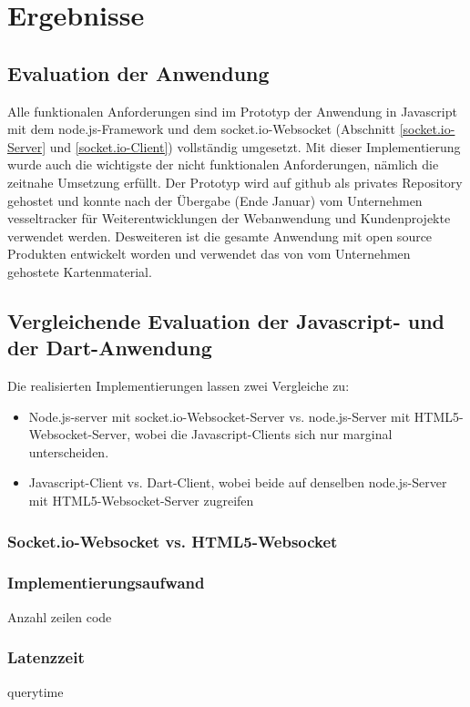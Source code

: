 \chapter{Ergebnisse}

\section{Evaluation der Anwendung}
Alle funktionalen Anforderungen sind im Prototyp der Anwendung in Javascript mit dem node.js-Framework und dem socket.io-Websocket (Abschnitt \ref{socket.io-Server} und \ref{socket.io-Client}) vollständig umgesetzt.
Mit dieser Implementierung wurde auch die wichtigste der nicht funktionalen Anforderungen, nämlich die zeitnahe Umsetzung erfüllt. Der Prototyp wird auf github als privates Repository gehostet und konnte nach der Übergabe (Ende Januar) vom Unternehmen vesseltracker für Weiterentwicklungen der Webanwendung und Kundenprojekte verwendet werden. 
Desweiteren ist die gesamte Anwendung mit open source Produkten entwickelt worden und verwendet das von vom Unternehmen gehostete Kartenmaterial. 

\section{Vergleichende Evaluation der Javascript- und der Dart-Anwendung}
Die realisierten Implementierungen lassen zwei Vergleiche zu: 
\begin{itemize}
\item Node.js-server mit socket.io-Websocket-Server vs. node.js-Server mit HTML5-Websocket-Server, wobei die Javascript-Clients sich nur marginal unterscheiden.
\item Javascript-Client vs. Dart-Client, wobei beide auf denselben node.js-Server mit HTML5-Websocket-Server zugreifen
\end{itemize}
\subsection{Socket.io-Websocket vs. HTML5-Websocket}
\subsection{Implementierungsaufwand}
Anzahl zeilen code

\subsection{Latenzzeit}
querytime

